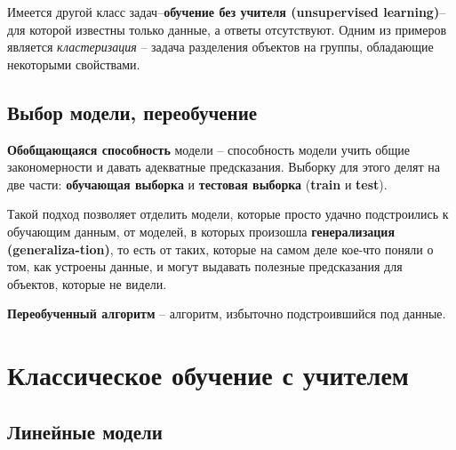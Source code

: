 \documentclass[a4paper,10pt, openany]{book} %
\begin{document}
	Имеется другой класс задач--\textbf{обучение без учителя (unsupervised learning)}-- для которой известны только данные, а ответы отсутствуют. Одним из примеров является \textit{кластеризация} -- задача разделения объектов на группы, обладающие некоторыми свойствами.
	
	\section{Выбор модели, переобучение}
	
	\textbf{Обобщающаяся способность} модели -- способность модели учить общие закономерности и давать адекватные предсказания. Выборку для этого делят на две части: \textbf{обучающая выборка} и \textbf{тестовая выборка} (\textbf{train} и \textbf{test}). 
	
	Такой подход позволяет отделить модели, которые просто удачно подстроились к обучающим данным, от моделей, в которых произошла \textbf{генерализация (generaliza-tion)}, то есть от таких, которые на самом деле кое-что поняли о том, как устроены данные, и могут выдавать полезные предсказания для объектов, которые не видели.
	
	\textbf{Переобученный алгоритм} -- алгоритм, избыточно подстроившийся под данные.
	
	\chapter{Классическое обучение с учителем}
	
	\section{Линейные модели}
\end{document}
